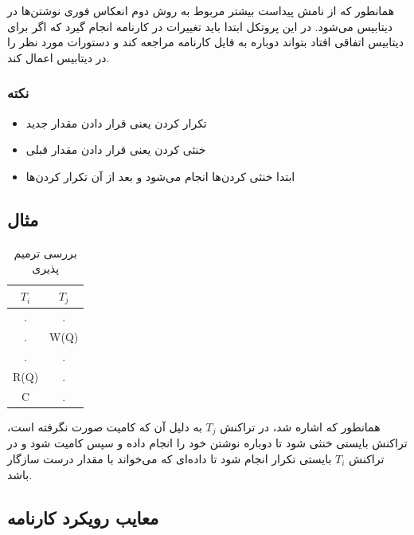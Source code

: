 همانطور که از نامش پیداست بیشتر مربوط به روش دوم انعکاس فوری نوشتن‌ها در دیتابیس
می‌شود. در این پروتکل ابتدا باید تغییرات در کارنامه انجام گیرد که اگر برای
دیتابیس اتفاقی افتاد بتواند دوباره به فایل کارنامه مراجعه کند و دستورات مورد نظر
را در دیتابیس اعمال کند.

\subsubsection*{نکته}

\begin{itemize}
    \item تکرار کردن یعنی قرار دادن مقدار جدید
    \item خنثی کردن یعنی قرار دادن مقدار قبلی
    \item ابتدا خنثی کردن‌ها انجام می‌شود و بعد از آن تکرار کردن‌ها
\end{itemize}


\subsection*{مثال}


\begin{LTR}
    \begin{table}[h]
        \centering
        \begin{RTL}
            \caption{بررسی ترمیم پذیری}
        \end{RTL}
        \begin{tabular}{c|c}
            $T_i$ & $T_j$ \\ \hline
            . & . \\
            . & W(Q) \\
            . & . \\
            R(Q) & . \\
            C & . \\
            \hline
        \end{tabular}
    \end{table}
\end{LTR}

همانطور که اشاره شد، در تراکنش $T_j$ به دلیل آن که کامیت صورت نگرفته است، تراکنش
بایستی خنثی شود تا دوباره نوشتن خود را انجام داده و سپس کامیت شود و در تراکنش
$T_i$ بایستی تکرار انجام شود تا داده‌ای که می‌خواند با مقدار درست سازگار باشد.

\subsection{معایب رویکرد کارنامه}

